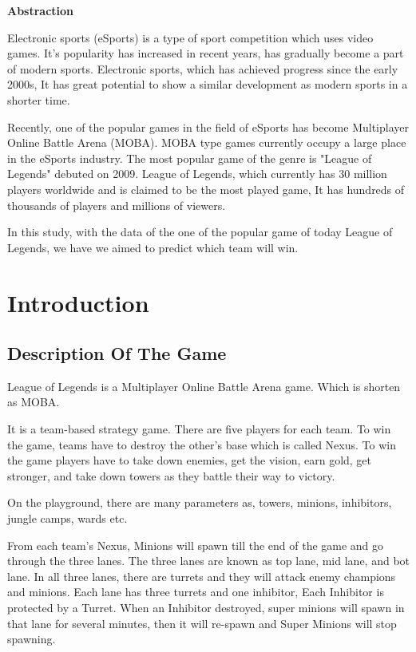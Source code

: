 \documentclass[a4paper]{article}
\begin{document}
{\centering\LARGE\bfseries
  Abstraction\par
}
\medskip
{\centering\large
Electronic sports (eSports) is a type of sport competition which uses video games.
It's popularity has increased in recent years, has gradually become a part of modern sports.
Electronic sports, which has achieved progress since the early 2000s,
It has great potential to show a similar development as modern sports in a shorter time.

Recently, one of the popular games in the field of eSports has become Multiplayer Online Battle Arena (MOBA). MOBA type games currently occupy a large place in the eSports industry. The most popular game of the genre is "League of Legends"  debuted on 2009. League of Legends, which currently has 30 million players worldwide and is claimed to be the most played game,
It has hundreds of thousands of players and millions of viewers.

In this study, with the data of the one of the popular game of today League of Legends,  we have we aimed to predict which team will win. \par}
\bigskip
\pagebreak


\setcounter{section}{0}
\centering
\section{Introduction}

\subsection{Description Of The Game}
League of Legends is a Multiplayer Online Battle Arena game. Which is shorten as MOBA.
\medskip
  
It is a team-based strategy game. There are five players for each team. To win the game, teams have to destroy the other's base which is called Nexus. To win the game players have to take down enemies, get the vision, earn gold, get stronger, and take down towers as they battle their way to victory.
\medskip
    
On the playground, there are many parameters as, towers, minions, inhibitors, jungle camps, wards etc.
\medskip

From each team's Nexus, Minions will spawn till the end of the game and go through the three lanes. The three lanes are known as top lane, mid lane, and bot lane. In all three lanes, there are turrets and they will attack enemy champions and minions. Each lane has three turrets and one inhibitor, Each Inhibitor is protected by a Turret. When an Inhibitor destroyed, super minions will spawn in that lane for several minutes, then it will re-spawn and Super Minions will stop spawning. 
\end{document}

